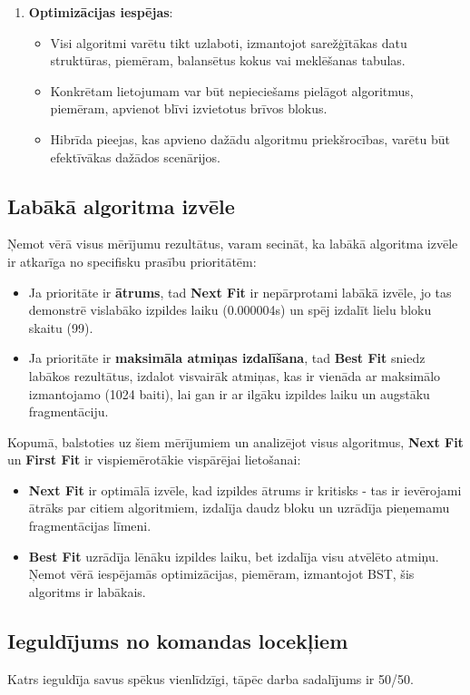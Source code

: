 \documentclass{report}
\begin{document}
\begin{enumerate}
		\item \textbf{Optimizācijas iespējas}:
		\begin{itemize}
			\item Visi algoritmi varētu tikt uzlaboti, izmantojot sarežģītākas datu struktūras, piemēram, balansētus kokus vai meklēšanas tabulas.
			\item Konkrētam lietojumam var būt nepieciešams pielāgot algoritmus, piemēram, apvienot blīvi izvietotus brīvos blokus.
			\item Hibrīda pieejas, kas apvieno dažādu algoritmu priekšrocības, varētu būt efektīvākas dažādos scenārijos.
		\end{itemize}
		
	\end{enumerate}
	
	\subsection{Labākā algoritma izvēle}
	
	Ņemot vērā visus mērījumu rezultātus, varam secināt, ka labākā algoritma izvēle ir atkarīga no specifisku prasību prioritātēm:
	
	\begin{itemize}
		\item Ja prioritāte ir \textbf{ātrums}, tad \textbf{Next Fit} ir nepārprotami labākā izvēle, jo tas demonstrē vislabāko izpildes laiku (0.000004s) un spēj izdalīt lielu bloku skaitu (99).
		
		\item Ja prioritāte ir \textbf{maksimāla atmiņas izdalīšana}, tad \textbf{Best Fit} sniedz labākos rezultātus, izdalot visvairāk atmiņas, kas ir vienāda ar maksimālo izmantojamo (1024 baiti), lai gan ir ar ilgāku izpildes laiku un augstāku fragmentāciju.
	\end{itemize}
		
		Kopumā, balstoties uz šiem mērījumiem un analizējot visus algoritmus, \textbf{Next Fit} un \textbf{First Fit} ir vispiemērotākie vispārējai lietošanai:
		
	\begin{itemize}
		\item \textbf{Next Fit} ir optimālā izvēle, kad izpildes ātrums ir kritisks - tas ir ievērojami ātrāks par citiem algoritmiem, izdalīja daudz bloku un uzrādīja pieņemamu fragmentācijas līmeni.
		
		\item \textbf{Best Fit} uzrādīja lēnāku izpildes laiku, bet izdalīja visu atvēlēto atmiņu. Ņemot vērā iespējamās optimizācijas, piemēram, izmantojot BST, šis algoritms ir labākais. 
	\end{itemize}
	
	\subsection{Ieguldījums no komandas locekļiem}
	Katrs ieguldīja savus spēkus vienlīdzīgi, tāpēc darba sadalījums ir 50/50.
\end{document}
